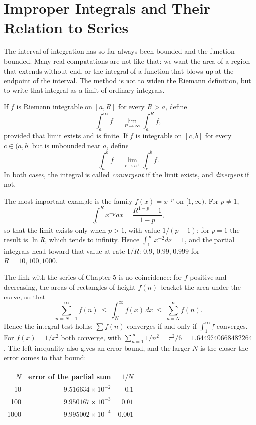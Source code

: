 \section{Improper Integrals and Their Relation to Series}

The interval of integration has so far always been bounded and the function bounded. Many real
computations are not like that: we want the area of a region that extends without end, or the integral
of a function that blows up at the endpoint of the interval. The method is not to widen the Riemann
definition, but to write that integral as a limit of ordinary integrals.

\begin{definisi}
If $f$ is Riemann integrable on $[a,R]$ for every $R>a$, define
\[
\int_a^\infty f=\lim_{R\to\infty}\int_a^R f ,
\]
provided that limit exists and is finite. If $f$ is integrable on $[c,b]$ for every
$c\in(a,b]$ but is unbounded near $a$, define
\[
\int_a^b f=\lim_{c\to a^{+}}\int_c^b f .
\]
In both cases, the integral is called \emph{convergent} if the limit exists, and
\emph{divergent} if not.
\end{definisi}

The most important example is the family $f(x)=x^{-p}$ on $[1,\infty)$. For $p\ne1$,
\[
\int_1^R x^{-p}dx=\frac{R^{1-p}-1}{1-p},
\]
so that the limit exists only when $p>1$, with value $1/(p-1)$; for $p=1$ the result is
$\ln R$, which tends to infinity. Hence $\int_1^\infty x^{-2}dx=1$, and the partial
integrals head toward that value at rate $1/R$: $0.9$, $0.99$, $0.999$ for
$R=10,100,1000$.

The link with the series of Chapter 5 is no coincidence: for $f$ positive and decreasing, the areas of
rectangles of height $f(n)$ bracket the area under the curve, so that
\[
\sum_{n=N+1}^{\infty}f(n)\ \le\ \int_N^\infty f(x)\,dx\ \le\ \sum_{n=N}^{\infty}f(n) .
\]
Hence the integral test holds: $\sum f(n)$ converges if and only if
$\int_1^\infty f$ converges. For $f(x)=1/x^2$ both converge, with
$\sum_{n=1}^{\infty}1/n^2=\pi^2/6=1.6449340668482264$. The left inequality also gives
an error bound, and the larger $N$ is the closer the error comes to that bound:

\begin{center}\small
\begin{tabular}{rrrr}
\hline
$N$ & error of the partial sum & $1/N$ \\
\hline
10 & $9.516634\times10^{-2}$ & $0.1$ \\
100 & $9.950167\times10^{-3}$ & $0.01$ \\
1000 & $9.995002\times10^{-4}$ & $0.001$ \\
\hline
\end{tabular}
\end{center}

